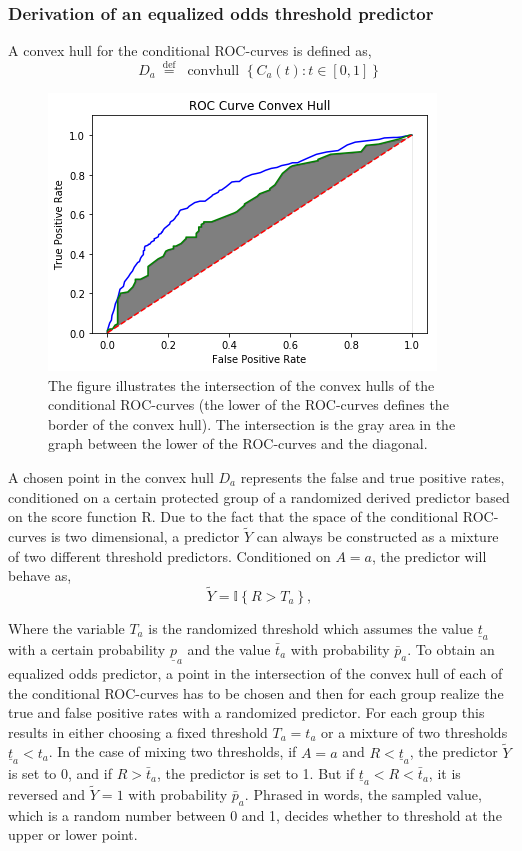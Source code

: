 \documentclass[11pt, fleqn, titlepage]{article}
\begin{document}
	\subsubsection{Derivation of an equalized odds threshold predictor} \label{optimalboi}
	A convex hull for the conditional ROC-curves is defined as, 
	\begin{equation*}\label{key}
	D_{a} \stackrel{\text { def }}{=} \text { convhull }\left\{C_{a}(t): t \in[0,1]\right\}
	\end{equation*}

	\begin{figure}[H]
		\centering
		\includegraphics[width=0.5\linewidth]{imgs/convex_hull}
		\caption{The figure illustrates the intersection of the convex hulls of the conditional ROC-curves (the lower of the ROC-curves defines the border of the convex hull). The intersection is the gray area in the graph between the lower of the ROC-curves and the diagonal.}
		\label{fig:convexhull}
	\end{figure}
	\noindent
	A chosen point in the convex hull $ D_a $ represents the false and true positive rates, conditioned on a certain protected group of a randomized derived predictor based on the score function R. Due to the fact that the space of the conditional ROC-curves is two dimensional, a predictor $ \tilde Y $ can always be constructed as a mixture of two different threshold predictors. Conditioned on $ A=a $, the predictor will behave as, 
	\begin{equation}\label{odds_pred}
	\widetilde{Y}=\mathbb{I}\left\{R>T_{a}\right\},
	\end{equation}
	
	\noindent Where the variable $ T_a $ is the randomized threshold which assumes the value $ \underline{t}_{a} $ with a certain probability $ \underline{p}_a $ and the value $\bar t_{a} $ with probability $ \bar p_a $. To obtain an equalized odds predictor, a point in the intersection of the convex hull of each of the conditional ROC-curves has to be chosen and then for each group realize the true and false positive rates with a randomized predictor. For each group this results in either choosing a fixed threshold $ T_a = t_a $ or a mixture of two thresholds $ \underline t_a < t_a $. In the case of mixing two thresholds, if $ A=a $ and $ R < \underline t_a $, the predictor $ \tilde Y $ is set to 0, and if $ R > \bar t_a $, the predictor is set to 1. But if $ \underline t_a < R < \bar t_a $, it is reversed and $ \tilde Y = 1 $ with probability $ \bar p_a$. Phrased in words, the sampled value, which is a random number between 0 and 1, decides whether to threshold at the upper or lower point.
	
\end{document}
